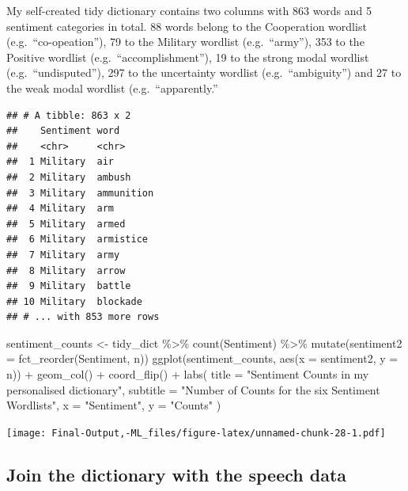 \documentclass[
]{article}
\newenvironment{Shaded}{\begin{snugshade}}{\end{snugshade}}
\newcommand{\AttributeTok}[1]{\textcolor[rgb]{0.77,0.63,0.00}{#1}}
\newcommand{\FunctionTok}[1]{\textcolor[rgb]{0.00,0.00,0.00}{#1}}
\newcommand{\NormalTok}[1]{#1}
\newcommand{\OtherTok}[1]{\textcolor[rgb]{0.56,0.35,0.01}{#1}}
\newcommand{\SpecialCharTok}[1]{\textcolor[rgb]{0.00,0.00,0.00}{#1}}
\newcommand{\StringTok}[1]{\textcolor[rgb]{0.31,0.60,0.02}{#1}}
\begin{document}
My self-created tidy dictionary contains two columns with 863 words and
5 sentiment categories in total. 88 words belong to the Cooperation
wordlist (e.g.~``co-opeation''), 79 to the Military wordlist
(e.g.~``army''), 353 to the Positive wordlist (e.g.~``accomplishment''),
19 to the strong modal wordlist (e.g.~``undisputed''), 297 to the
uncertainty wordlist (e.g.~``ambiguity'') and 27 to the weak modal
wordlist (e.g.~``apparently.''

\begin{verbatim}
## # A tibble: 863 x 2
##    Sentiment word      
##    <chr>     <chr>     
##  1 Military  air       
##  2 Military  ambush    
##  3 Military  ammunition
##  4 Military  arm       
##  5 Military  armed     
##  6 Military  armistice 
##  7 Military  army      
##  8 Military  arrow     
##  9 Military  battle    
## 10 Military  blockade  
## # ... with 853 more rows
\end{verbatim}

\begin{Shaded}
\begin{Highlighting}[]
\NormalTok{sentiment\_counts }\OtherTok{\textless{}{-}}\NormalTok{ tidy\_dict }\SpecialCharTok{\%\textgreater{}\%}  
  \FunctionTok{count}\NormalTok{(Sentiment) }\SpecialCharTok{\%\textgreater{}\%}  
 \FunctionTok{mutate}\NormalTok{(}\AttributeTok{sentiment2 =} \FunctionTok{fct\_reorder}\NormalTok{(Sentiment, n)) }
\FunctionTok{ggplot}\NormalTok{(sentiment\_counts, }\FunctionTok{aes}\NormalTok{(}\AttributeTok{x =}\NormalTok{ sentiment2, }\AttributeTok{y =}\NormalTok{ n)) }\SpecialCharTok{+} 
  \FunctionTok{geom\_col}\NormalTok{() }\SpecialCharTok{+} 
  \FunctionTok{coord\_flip}\NormalTok{() }\SpecialCharTok{+} 
  \FunctionTok{labs}\NormalTok{( }
    \AttributeTok{title =} \StringTok{"Sentiment Counts in my personalised dictionary"}\NormalTok{, }
    \AttributeTok{subtitle =} \StringTok{"Number of Counts for the six Sentiment Wordlists"}\NormalTok{,}
    \AttributeTok{x =} \StringTok{"Sentiment"}\NormalTok{, }
    \AttributeTok{y =} \StringTok{"Counts"} 
\NormalTok{  )}
\end{Highlighting}
\end{Shaded}

\texttt{[image: Final-Output,-ML\_files/figure-latex/unnamed-chunk-28-1.pdf]}

\hypertarget{join-the-dictionary-with-the-speech-data}{%
\subsection{Join the dictionary with the speech
data}\label{join-the-dictionary-with-the-speech-data}}
\end{document}
